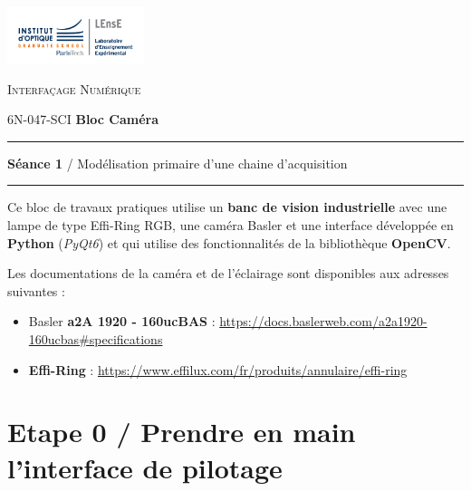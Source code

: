 \documentclass[a4paper,11pt,titlepage]{article} %
\begin{document}
\begin{minipage}[c]{.25\linewidth}
	\includegraphics[width=4cm]{images/Logo-LEnsE.png}
\end{minipage} \hfill
\begin{minipage}[c]{.4\linewidth}

\begin{center}
\vspace{0.3cm}
{\Large \textsc{Interfaçage Numérique}}

\medskip

6N-047-SCI \qquad \textbf{\Large Bloc Caméra}

\end{center}
\end{minipage}\hfill

\vspace{0.5cm}

\noindent \rule{\linewidth}{1pt}

{\noindent\Large \rule[-7pt]{0pt}{30pt} \textbf{Séance 1} / Modélisation primaire d'une chaine d'acquisition} 

\noindent \rule{\linewidth}{1pt}

Ce bloc de travaux pratiques utilise un \textbf{banc de vision industrielle} avec une lampe de type Effi-Ring RGB, une caméra Basler et une interface développée en \textbf{Python} (\textit{PyQt6}) et qui utilise des fonctionnalités de la bibliothèque \textbf{OpenCV}.

Les documentations de la caméra et de l'éclairage sont disponibles aux adresses suivantes : 

\begin{itemize}
	\item Basler \textbf{a2A 1920 - 160ucBAS} : \href{https://docs.baslerweb.com/a2a1920-160ucbas#specifications}{https://docs.baslerweb.com/a2a1920-160ucbas\#specifications}
	\item \textbf{Effi-Ring} : \href{https://www.effilux.com/fr/produits/annulaire/effi-ring}{https://www.effilux.com/fr/produits/annulaire/effi-ring}
\end{itemize}


\section{Etape 0 / Prendre en main l'interface de pilotage}
\end{document}
